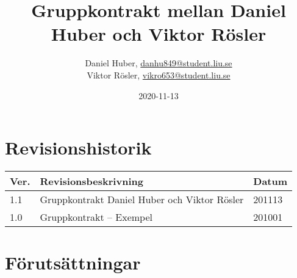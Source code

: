 \documentclass{mall}
\author{Daniel Huber, \url{danhu849@student.liu.se}\\
  Viktor Rösler, \url{vikro653@student.liu.se}\\
  }
\title{Gruppkontrakt mellan Daniel Huber och Viktor Rösler}
\date{2020-11-13}
\begin{document}
\projectpage

\section{Revisionshistorik}
\begin{table}[!h]
\begin{tabularx}{\linewidth}{|l|X|l|}
\hline
Ver. & Revisionsbeskrivning & Datum \\\hline
1.1 & Gruppkontrakt Daniel Huber och Viktor Rösler & 201113 \\\hline
1.0 & Gruppkontrakt -- Exempel & 201001 \\\hline
\end{tabularx}
\end{table}

\section{Förutsättningar}
\label{prereq}
\end{document}
